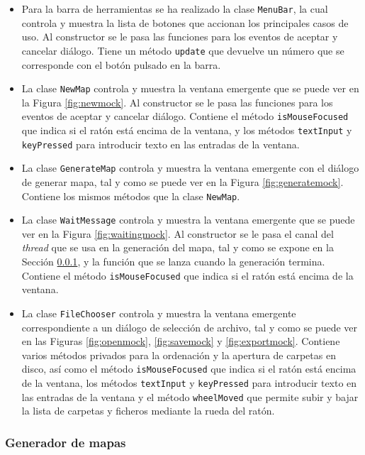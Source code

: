 \begin{itemize}
	\item Para la barra de herramientas se ha realizado la clase \texttt{MenuBar}, la cual controla y muestra la lista de botones que accionan los principales casos de uso. Al constructor se le pasa las funciones para los eventos de aceptar y cancelar diálogo. Tiene un método \texttt{update} que devuelve un número que se corresponde con el botón pulsado en la barra.
	\item La clase \texttt{NewMap} controla y muestra la ventana emergente que se puede ver en la Figura \ref{fig:newmock}. Al constructor se le pasa las funciones para los eventos de aceptar y cancelar diálogo. Contiene el método \texttt{isMouseFocused} que indica si el ratón está encima de la ventana, y los métodos \texttt{textInput} y \texttt{keyPressed} para introducir texto en las entradas de la ventana.
	\item La clase \texttt{GenerateMap} controla y muestra la ventana emergente con el diálogo de generar mapa, tal y como se puede ver en la Figura \ref{fig:generatemock}. Contiene los mismos métodos que la clase \texttt{NewMap}.
	\item La clase \texttt{WaitMessage} controla y muestra la ventana emergente que se puede ver en la Figura \ref{fig:waitingmock}. Al constructor se le pasa el canal del \textit{thread} que se usa en la generación del mapa, tal y como se expone en la Sección \ref{subsubsec:generator}, y la función que se lanza cuando la generación termina. Contiene el método \texttt{isMouseFocused} que indica si el ratón está encima de la ventana.
	\item La clase \texttt{FileChooser} controla y muestra la ventana emergente correspondiente a un diálogo de selección de archivo, tal y como se puede ver en las Figuras \ref{fig:openmock}, \ref{fig:savemock} y \ref{fig:exportmock}. Contiene varios métodos privados para la ordenación y la apertura de carpetas en disco, así como el método \texttt{isMouseFocused} que indica si el ratón está encima de la ventana, los métodos \texttt{textInput} y \texttt{keyPressed} para introducir texto en las entradas de la ventana y el método \texttt{wheelMoved} que permite subir y bajar la lista de carpetas y ficheros mediante la rueda del ratón.
\end{itemize}

\subsubsection{Generador de mapas}
\label{subsubsec:generator}

